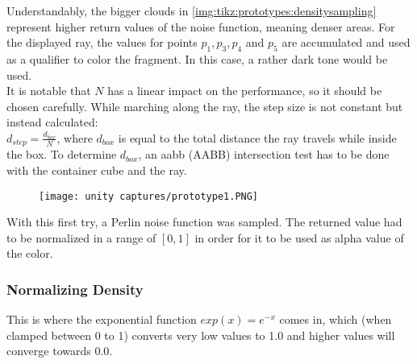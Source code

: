 \noindent
Understandably, the bigger clouds in \autoref{img:tikz:prototypes:densitysampling} represent higher return values of the noise function, meaning denser areas.
For the displayed ray, the values for points $p_1, p_3, p_4$ and $p_5$ are accumulated and used as a qualifier to color the fragment. In this case, a rather dark tone would be used.
\\
It is notable that $N$ has a linear impact on the performance, so it should be chosen carefully.
\emptyline
While marching along the ray, the step size is not constant but instead calculated: \\
$ d_{step} = \frac{d_{box}}{N}$, where $d_{box}$ is equal to the total distance the ray travels while inside the box. To determine $d_{box}$, an \gls{aabb} (AABB) intersection test \cite{online:aabb} has to be done with the container cube and the ray.

\begin{figure}[H]
    \centering
    \texttt{[image: unity captures/prototype1.PNG]}
    \label{img:captures:prototype1}
\end{figure}

\noindent
With this first try, a Perlin noise function was sampled. The returned value had to be normalized in a range of $[0, 1]$ in order for it to be used as alpha value of the color.

\subsubsection{Normalizing Density}
This is where the exponential function $exp(x) = e^{-x}$ comes in, which (when clamped between 0 to 1) converts very low values to 1.0 and higher values will converge towards 0.0.

